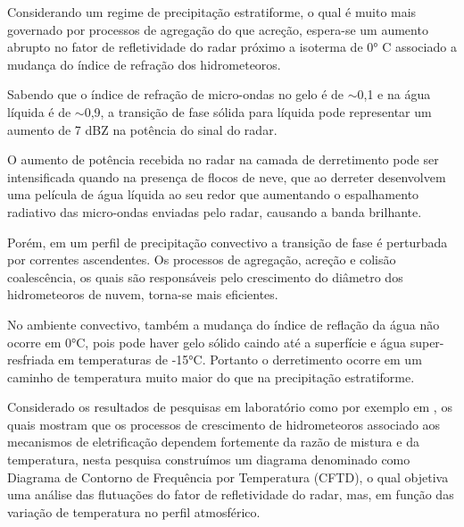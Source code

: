Considerando um regime de precipitação estratiforme, o qual é muito mais governado por processos de agregação do que acreção, espera-se um aumento abrupto no fator de refletividade do radar próximo a isoterma de 0° C associado a mudança do índice de refração dos hidrometeoros. 

Sabendo que o índice de refração de micro-ondas no gelo é de $\sim$0,1 e na água líquida é de $\sim$0,9, a transição de fase sólida para líquida pode representar um aumento de 7 dBZ na potência do sinal do radar. 

O aumento de potência recebida no radar na camada de derretimento pode ser intensificada quando na presença de flocos de neve, que ao derreter desenvolvem uma película de água líquida ao seu redor que aumentando o espalhamento radiativo das micro-ondas enviadas pelo radar, causando a banda brilhante.






Porém, em um perfil de precipitação convectivo a transição de fase é perturbada por correntes ascendentes. Os processos de agregação, acreção e colisão coalescência, os quais são responsáveis pelo crescimento do diâmetro dos hidrometeoros de nuvem, torna-se mais eficientes. 



No ambiente convectivo, também a mudança do índice de reflação da água não ocorre em 0°C, pois pode haver gelo sólido caindo até a superfície e água super-resfriada em temperaturas de -15°C. Portanto o derretimento ocorre em um caminho de temperatura muito maior do que na precipitação estratiforme.



Considerado os resultados de pesquisas em laboratório como por exemplo em , os quais mostram que os processos de crescimento de hidrometeoros associado aos mecanismos de eletrificação dependem fortemente da razão de mistura e da temperatura, nesta pesquisa construímos um diagrama denominado como Diagrama de Contorno de Frequência por Temperatura (CFTD),  o qual objetiva uma análise das flutuações do fator de refletividade do radar, mas, em função das variação de temperatura no perfil atmosférico.

